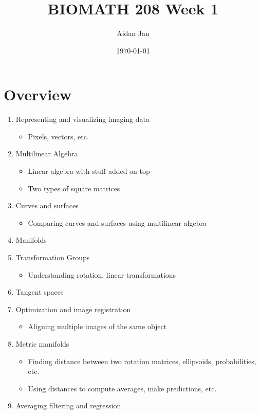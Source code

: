 \documentclass[10pt]{article}
\title{BIOMATH 208 Week 1}
\author{Aidan Jan}
\date{\today}
\begin{document}
\maketitle
\section*{Overview}
\begin{enumerate}
    \item Representing and visualizing imaging data
    \begin{itemize}
        \item Pixels, vectors, etc.
    \end{itemize}
    \item Multilinear Algebra
    \begin{itemize}
        \item Linear algebra with stuff added on top
        \item Two types of square matrices
    \end{itemize}
    \item Curves and surfaces
    \begin{itemize}
        \item Comparing curves and surfaces using multilinear algebra
    \end{itemize}
    \item Manifolds
    \item Transformation Groups
    \begin{itemize}
        \item Understanding rotation, linear transformations
    \end{itemize}
    \item Tangent spaces
    \item Optimization and image registration
    \begin{itemize}
        \item Aligning multiple images of the same object
    \end{itemize}
    \item Metric manifolds
    \begin{itemize}
        \item Finding distance between two rotation matrices, ellipsoids, probabilities, etc.
        \item Using distances to compute averages, make predictions, etc.
    \end{itemize}
    \item Averaging filtering and regression
\end{enumerate}
\end{document}
